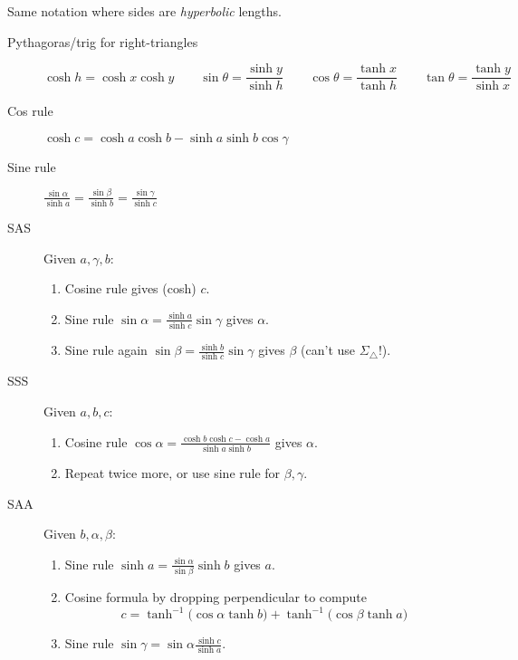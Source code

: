 \clearpage


Same notation where sides are \emph{hyperbolic} lengths. 

\begin{description}
	\item[Pythagoras/trig for right-triangles]
	\[\cosh h=\cosh x\cosh y\qquad\sin\theta=\frac{\sinh y}{\sinh h}\qquad \cos\theta=\frac{\tanh x}{\tanh h}\qquad \tan\theta=\frac{\tanh y}{\sinh x}\]
	
	\item[Cos rule] $\cosh c=\cosh a\cosh b-\sinh a\sinh b\cos\gamma$
	
	\item[Sine rule] $\frac{\sin\alpha}{\sinh a} =\frac{\sin\beta}{\sinh b} =\frac{\sin\gamma}{\sinh c}$
	
	\item[SAS] Given $a,\gamma,b$:
	\begin{enumerate}
	  \item Cosine rule gives (cosh) $c$.
	  \item Sine rule $\sin\alpha=\frac{\sinh a}{\sinh c}\sin\gamma$ gives $\alpha$.
	  \item Sine rule again $\sin\beta=\frac{\sinh b}{\sinh c}\sin\gamma$ gives $\beta$ (can't use $\Sigma_\triangle$!).
	\end{enumerate}
	
	\item[SSS] Given $a,b,c$:
	\begin{enumerate}
	  \item Cosine rule $\cos\alpha=\frac{\cosh b\cosh c-\cosh a}{\sinh a\sinh b}$ gives $\alpha$.
	  \item Repeat twice more, or use sine rule for $\beta,\gamma$.
	\end{enumerate}
	
	\item[SAA] Given $b,\alpha,\beta$:
	\begin{enumerate}
	  \item Sine rule $\sinh a=\frac{\sin\alpha}{\sin\beta}\sinh b$ gives $a$.
	  \item Cosine formula by dropping perpendicular to compute
	  \[c=\tanh^{-1}\bigl(\cos\alpha\tanh b\bigr) + \tanh^{-1}\bigl(\cos\beta\tanh a\bigr)\]
	  \item Sine rule $\sin\gamma=\sin\alpha\frac{\sinh c}{\sinh a}$.
	\end{enumerate}
	

\end{description}
